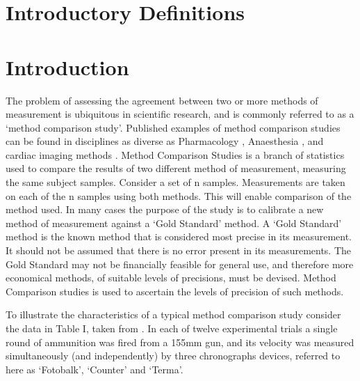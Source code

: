 \documentclass{report}
\begin{document}
\section{Introductory Definitions}



\section{Introduction}
The problem of assessing the agreement between two or more methods of measurement is ubiquitous in scientific research, and is commonly referred to as a `method comparison study'. Published examples of method comparison studies can be found in disciplines
as diverse as Pharmacology \citep{ludbrook97}, Anaesthesia \citep{Myles}, and cardiac imaging methods \citep{Krumm}.
\smallskip
Method Comparison Studies is a branch of statistics used to compare the results of two different method of measurement, measuring the same subject samples. Consider a set of n samples. Measurements are taken on each of the n samples using both methods. This will enable comparison of the method used.
\smallskip
In many cases the purpose of the study is to calibrate a new method of measurement against a ‘Gold Standard’ method. A ‘Gold Standard’ method is the known method that is considered most precise in its measurement. It should not be assumed that there is no error present in its measurements.
\smallskip
The Gold Standard may not be financially feasible for general use, and therefore more economical methods, of suitable levels of precisions, must be devised. Method Comparison studies is used to ascertain the levels of precision of such methods.
\smallskip

To illustrate the characteristics of a typical method comparison study consider the data in Table I, taken from \citet{Grubbs73}.
\smallskip
In each of twelve experimental trials a single round of ammunition was fired from a 155mm gun, and its velocity was measured
simultaneously (and independently) by three chronographs devices, referred to here as `Fotobalk', `Counter' and `Terma'.
\smallskip


\newpage
\end{document}
